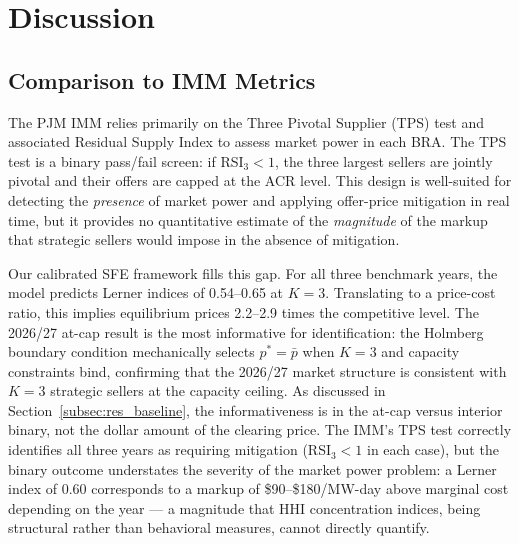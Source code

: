 
\section{Discussion}
\label{sec:discussion}

\subsection{Comparison to IMM Metrics}
\label{subsec:disc_imm}

The PJM IMM relies primarily on the Three Pivotal Supplier (TPS) test and
associated Residual Supply Index to assess market power in each BRA. The TPS
test is a binary pass/fail screen: if RSI$_3 < 1$, the three largest sellers
are jointly pivotal and their offers are capped at the ACR level. This design
is well-suited for detecting the \textit{presence} of market power and applying
offer-price mitigation in real time, but it provides no quantitative estimate
of the \textit{magnitude} of the markup that strategic sellers would impose in
the absence of mitigation.

Our calibrated SFE framework fills this gap. For all three benchmark years, the
model predicts Lerner indices of 0.54--0.65 at $K = 3$. Translating to a
price-cost ratio, this implies equilibrium prices 2.2--2.9 times the
competitive level. The 2026/27 at-cap result is the most informative for identification: the
Holmberg boundary condition mechanically selects $p^* = \bar{p}$ when $K = 3$
and capacity constraints bind, confirming that the 2026/27 market structure
is consistent with $K = 3$ strategic sellers at the capacity ceiling. As
discussed in Section~\ref{subsec:res_baseline}, the informativeness is in the
at-cap versus interior binary, not the dollar amount of the clearing price. The IMM's TPS test
correctly identifies all three years as requiring mitigation (RSI$_3 < 1$ in
each case), but the binary outcome understates the severity of the market power
problem: a Lerner index of 0.60 corresponds to a markup of \$90--\$180/MW-day above
marginal cost depending on the year --- a magnitude that HHI concentration
indices, being structural rather than behavioral measures, cannot directly
quantify.

